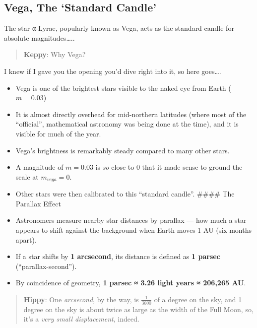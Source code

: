 \documentclass[
  letterpaper,
]{book}
\providecommand{\tightlist}{%
  \setlength{\itemsep}{0pt}\setlength{\parskip}{0pt}}
\begin{document}
\subsection{Vega, The `Standard Candle'}\label{vega-the-standard-candle}

The star α-Lyrae, popularly known as Vega, acts as the standard candle
for absolute magnitudes\ldots..

\begin{quote}
\textbf{Keppy}: Why Vega?
\end{quote}

I knew if I gave you the opening you'd dive right into it, so here
goes\ldots.

\begin{itemize}
\tightlist
\item
  Vega is one of the brightest stars visible to the naked eye from Earth
  (\(m = 0.03\))
\item
  It is almost directly overhead for mid-northern latitudes (where most
  of the ``official'', mathematical astronomy was being done at the
  time), and it is visible for much of the year.
\item
  Vega's brightness is remarkably steady compared to many other stars.
\item
  A magnitude of \(m = 0.03\) is \emph{so} close to 0 that it made sense
  to ground the scale at \(m_{vega} = 0\).
\item
  Other stars were then calibrated to this ``standard candle''. \#\#\#\#
  The Parallax Effect
\item
  Astronomers measure nearby star distances by parallax --- how much a
  star appears to shift against the background when Earth moves 1 AU
  (six months apart).\\
\item
  If a star shifts by \textbf{1 arcsecond}, its distance is defined as
  \textbf{1 parsec} (``parallax-second'').\\
\item
  By coincidence of geometry, \textbf{1 parsec ≈ 3.26 light years ≈
  206,265 AU}.
\end{itemize}

\begin{quote}
\textbf{Hippy}: One \emph{arcsecond}, by the way, is \(\frac{1}{3600}\)
of a degree on the sky, and 1 degree on the sky is about twice as large
as the width of the Full Moon, so, it's a \emph{very small
displacement}, indeed.
\end{quote}
\end{document}
